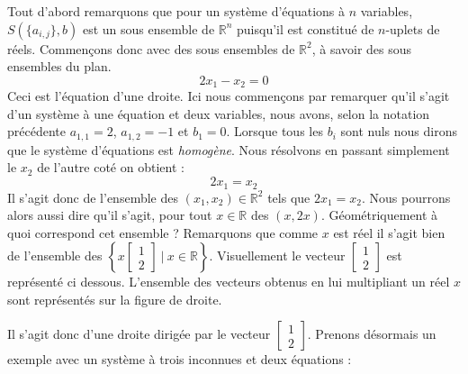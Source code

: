 \documentclass{article}
\newcommand{\R}{\mathbb{R}}
\begin{document}
\noindent Tout d'abord remarquons que pour un système d'équations à $n$ variables, $S(\{a_{i,j}\}, b)$ est un sous ensemble de $\mathbb{R}^n$ puisqu'il est constitué de $n$-uplets de réels. Commençons donc avec des sous ensembles de $\mathbb{R}^2$, à savoir des sous ensembles du plan. 
$$ 2x_1 - x_2 = 0 $$
\noindent Ceci est l'équation d'une droite. Ici nous commençons par remarquer qu'il s'agit d'un système à une équation et deux variables, nous avons, selon la notation précédente $a_{1,1} =2 $, $a_{1,2} = -1$ et  $b_1 = 0$. Lorsque tous les $b_i$ sont nuls nous dirons que le système d'équations est \textit{homogène}. Nous résolvons en passant simplement le $x_2$ de l'autre coté on obtient :
$$2x_1 = x_2$$
Il s'agit donc de l'ensemble des $(x_1, x_2) \in \mathbb{R}^2$ tels que $2x_1 = x_2$. Nous pourrons alors aussi dire qu'il s'agit, pour tout $x\in \mathbb{R}$ des $(x, 2x)$. Géométriquement à quoi correspond cet ensemble ? Remarquons que comme $x$ est réel il s'agit bien de l'ensemble des $\left\{x\begin{bmatrix}1 \\ 2 \end{bmatrix} \ | \ x \in \R\right\}$. Visuellement le vecteur $\begin{bmatrix}1 \\ 2 \end{bmatrix}$ est représenté ci dessous. L'ensemble des vecteurs obtenus en lui multipliant un réel $x$ sont représentés sur la figure de droite.
\begin{center}
\hspace{2CM}
\end{center}
Il s'agit donc d'une droite dirigée par le vecteur $\begin{bmatrix}1 \\ 2 \end{bmatrix}$. Prenons désormais un exemple avec un système à trois inconnues et deux équations :
\end{document}
